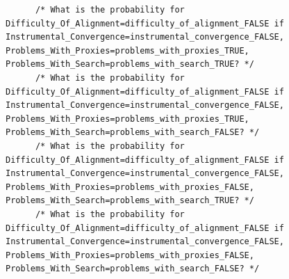 \documentclass[
  11pt,
  letterpaper,
]{book}
\begin{document}
\begin{landscape}
\begin{verbatim}
      /* What is the probability for Difficulty_Of_Alignment=difficulty_of_alignment_FALSE if Instrumental_Convergence=instrumental_convergence_FALSE, Problems_With_Proxies=problems_with_proxies_TRUE, Problems_With_Search=problems_with_search_TRUE? */
      /* What is the probability for Difficulty_Of_Alignment=difficulty_of_alignment_FALSE if Instrumental_Convergence=instrumental_convergence_FALSE, Problems_With_Proxies=problems_with_proxies_TRUE, Problems_With_Search=problems_with_search_FALSE? */
      /* What is the probability for Difficulty_Of_Alignment=difficulty_of_alignment_FALSE if Instrumental_Convergence=instrumental_convergence_FALSE, Problems_With_Proxies=problems_with_proxies_FALSE, Problems_With_Search=problems_with_search_TRUE? */
      /* What is the probability for Difficulty_Of_Alignment=difficulty_of_alignment_FALSE if Instrumental_Convergence=instrumental_convergence_FALSE, Problems_With_Proxies=problems_with_proxies_FALSE, Problems_With_Search=problems_with_search_FALSE? */

\end{verbatim}
\end{landscape}
\end{document}
